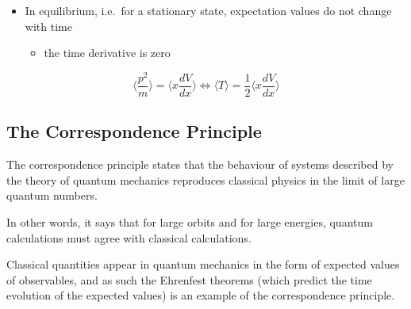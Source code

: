 \documentclass[a4paper,11pt,normalem]{article}
\begin{document}
\begin{itemize}
\item
  In equilibrium, i.e.~for a stationary state, expectation values do not
  change with time
  \begin{itemize}
  \item
    the time derivative is zero
  \end{itemize}
\end{itemize}

\[
    \bigg\langle \frac{p^2}{m} \bigg\rangle = \bigg\langle x\frac{dV}{dx}\bigg\rangle \iff \langle T \rangle = \frac{1}{2}\bigg\langle x \frac{dV}{dx}\bigg\rangle
\]

\subsection{The Correspondence Principle}\label{the-correspondence-principle}

The correspondence principle states that the behaviour of systems
described by the theory of quantum mechanics reproduces classical
physics in the limit of large quantum numbers.

In other words, it says that for large orbits and for large energies,
quantum calculations must agree with classical calculations.

Classical quantities appear in quantum mechanics in the form of expected
values of observables, and as such the Ehrenfest theorems (which predict
the time evolution of the expected values) is an example of the
correspondence principle.
\end{document}
